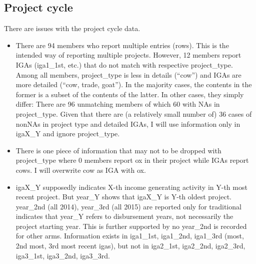 \subsection{Project cycle}


There are issues with the project cycle data. 
\begin{itemize}
\vspace{1.0ex}\setlength{\itemsep}{1.0ex}\setlength{\baselineskip}{12pt}
\item  There are 94 members who report multiple entries (rows). This is the intended way of reporting multiple projects. However, 12 members report IGAs (\textsf{iga1\_1st}, etc.) that do not match with respective \textsf{project\_type}. Among all members, \textsf{project\_type} is less in details (``cow'') and IGAs are more detailed (``cow, trade, goat''). In the majority cases, the contents in the former is a subset of the contents of the latter. In other cases, they simply differ: There are 96 unmatching members of which 60 with NAs in \textsf{project\_type}. Given that there are (a relatively small number of) 36 cases of nonNAs in project type and detailed IGAs, I will use information only in \textsf{igaX\_Y} and ignore \textsf{project\_type}. 
\item	There is one piece of information that may not to be dropped with \textsf{project\_type} where 0 members report ox in their project while IGAs report cows. I will overwrite cow as IGA with ox.
\item	\textsf{igaX\_Y} supposedly indicates \textsf{X}-th income generating activity in \textsf{Y}-th most recent project. But \textsf{year\_Y} shows that \textsf{igaX\_Y} is \textsf{Y}-th oldest project. \textsf{year\_2nd} (all 2014), \textsf{year\_3rd} (all 2015) are reported only for \textsf{traditional} indicates that \textsf{year\_Y} refers to disbursement years, not necessarily the project starting year. This is further supported by no \textsf{year\_2nd} is recorded for other arms. Information exists in \textsf{iga1\_1st}, \textsf{iga1\_2nd}, \textsf{iga1\_3rd} (most, 2nd most, 3rd most recent igas), but not in \textsf{iga2\_1st}, \textsf{iga2\_2nd}, \textsf{iga2\_3rd}, \textsf{iga3\_1st}, \textsf{iga3\_2nd}, \textsf{iga3\_3rd}. 
\end{itemize}
